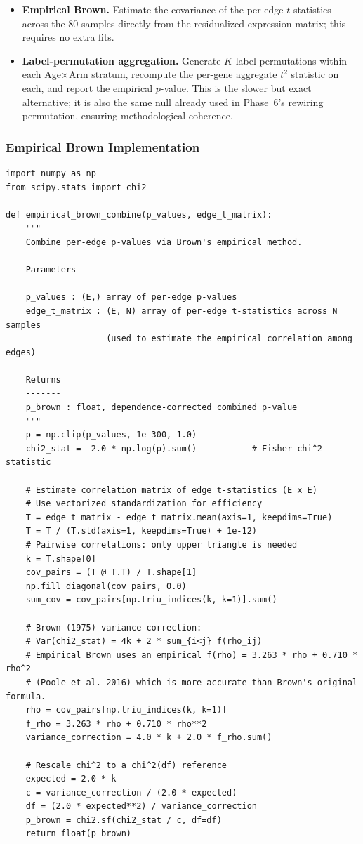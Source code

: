 \documentclass[11pt]{article}
\begin{document}
\begin{itemize}[leftmargin=*]
\item \textbf{Empirical Brown.} Estimate the covariance of the per-edge $t$-statistics across the 80 samples directly from the residualized expression matrix; this requires no extra fits.
\item \textbf{Label-permutation aggregation.} Generate $K$ label-permutations within each Age$\times$Arm stratum, recompute the per-gene aggregate $t^2$ statistic on each, and report the empirical $p$-value. This is the slower but exact alternative; it is also the same null already used in Phase~6's rewiring permutation, ensuring methodological coherence.
\end{itemize}

\subsubsection{Empirical Brown Implementation}

\begin{lstlisting}[style=pythonstyle,caption={Empirical Brown's method for per-gene aggregation.}]
import numpy as np
from scipy.stats import chi2

def empirical_brown_combine(p_values, edge_t_matrix):
    """
    Combine per-edge p-values via Brown's empirical method.

    Parameters
    ----------
    p_values : (E,) array of per-edge p-values
    edge_t_matrix : (E, N) array of per-edge t-statistics across N samples
                    (used to estimate the empirical correlation among edges)

    Returns
    -------
    p_brown : float, dependence-corrected combined p-value
    """
    p = np.clip(p_values, 1e-300, 1.0)
    chi2_stat = -2.0 * np.log(p).sum()           # Fisher chi^2 statistic

    # Estimate correlation matrix of edge t-statistics (E x E)
    # Use vectorized standardization for efficiency
    T = edge_t_matrix - edge_t_matrix.mean(axis=1, keepdims=True)
    T = T / (T.std(axis=1, keepdims=True) + 1e-12)
    # Pairwise correlations: only upper triangle is needed
    k = T.shape[0]
    cov_pairs = (T @ T.T) / T.shape[1]
    np.fill_diagonal(cov_pairs, 0.0)
    sum_cov = cov_pairs[np.triu_indices(k, k=1)].sum()

    # Brown (1975) variance correction:
    # Var(chi2_stat) = 4k + 2 * sum_{i<j} f(rho_ij)
    # Empirical Brown uses an empirical f(rho) = 3.263 * rho + 0.710 * rho^2
    # (Poole et al. 2016) which is more accurate than Brown's original formula.
    rho = cov_pairs[np.triu_indices(k, k=1)]
    f_rho = 3.263 * rho + 0.710 * rho**2
    variance_correction = 4.0 * k + 2.0 * f_rho.sum()

    # Rescale chi^2 to a chi^2(df) reference
    expected = 2.0 * k
    c = variance_correction / (2.0 * expected)
    df = (2.0 * expected**2) / variance_correction
    p_brown = chi2.sf(chi2_stat / c, df=df)
    return float(p_brown)
\end{lstlisting}
\end{document}
